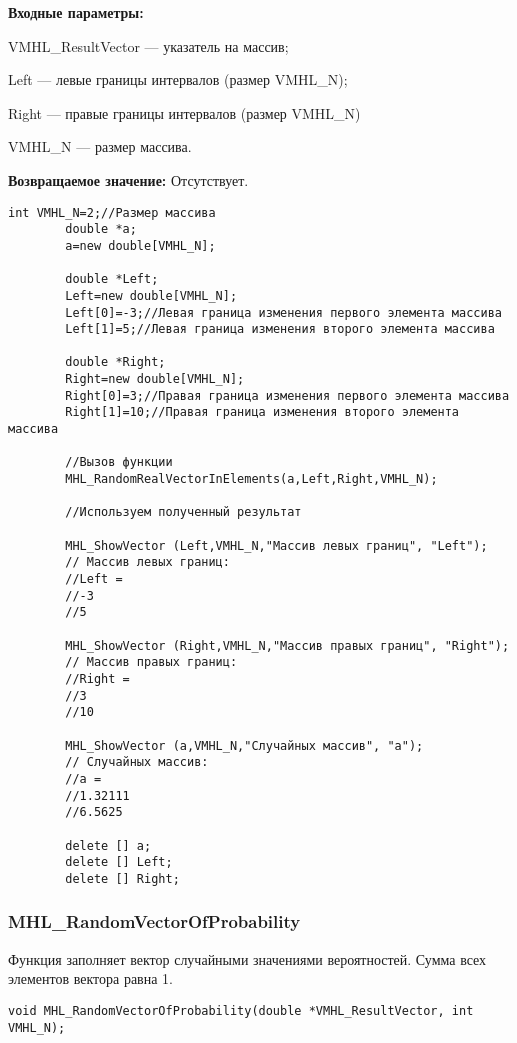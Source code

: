 \documentclass[a4paper,12pt]{article}
\begin{document}
\textbf{Входные параметры:}

 VMHL\_ResultVector --- указатель на массив;
 
 Left --- левые границы интервалов (размер VMHL\_N);
 
 Right --- правые границы интервалов (размер VMHL\_N)
 
 VMHL\_N --- размер массива.

\textbf{Возвращаемое значение:}
Отсутствует.


\begin{lstlisting}[label=code_use_MHL_RandomRealVectorInElements,caption=Пример использования]
        int VMHL_N=2;//Размер массива
        double *a;
        a=new double[VMHL_N];

        double *Left;
        Left=new double[VMHL_N];
        Left[0]=-3;//Левая граница изменения первого элемента массива
        Left[1]=5;//Левая граница изменения второго элемента массива

        double *Right;
        Right=new double[VMHL_N];
        Right[0]=3;//Правая граница изменения первого элемента массива
        Right[1]=10;//Правая граница изменения второго элемента массива

        //Вызов функции
        MHL_RandomRealVectorInElements(a,Left,Right,VMHL_N);

        //Используем полученный результат

        MHL_ShowVector (Left,VMHL_N,"Массив левых границ", "Left");
        // Массив левых границ:
        //Left =
        //-3
        //5

        MHL_ShowVector (Right,VMHL_N,"Массив правых границ", "Right");
        // Массив правых границ:
        //Right =
        //3
        //10

        MHL_ShowVector (a,VMHL_N,"Случайных массив", "a");
        // Случайных массив:
        //a =
        //1.32111
        //6.5625

        delete [] a;
        delete [] Left;
        delete [] Right;
\end{lstlisting}

\subsubsection{MHL\_RandomVectorOfProbability}\label{MHL_RandomVectorOfProbability}

Функция заполняет вектор случайными значениями вероятностей. Сумма всех элементов вектора равна 1.


\begin{lstlisting}[label=code_syntax_MHL_RandomVectorOfProbability,caption=Синтаксис]
void MHL_RandomVectorOfProbability(double *VMHL_ResultVector, int VMHL_N);
\end{lstlisting}
\end{document}
